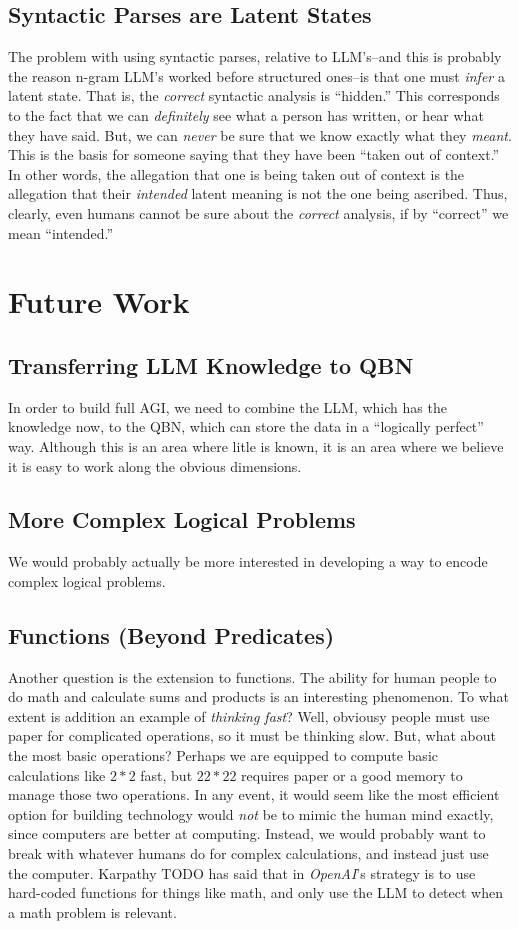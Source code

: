 \documentclass[12pt]{article}
\begin{document}
\subsection{Syntactic Parses are Latent States}
The problem with using syntactic parses, relative to LLM's--and this is probably the reason n-gram LLM's worked before structured ones--is that one must {\em infer} a latent state.
That is, the {\em correct} syntactic analysis is ``hidden.''
This corresponds to the fact that we can {\em definitely} see what a person has written, or hear what they have said.
But, we can {\em never} be sure that we know exactly what they {\em meant}.
This is the basis for someone saying that they have been ``taken out of context.''
In other words, the allegation that one is being taken out of context is the allegation that their {\em intended} latent meaning is not the one being ascribed.
Thus, clearly, even humans cannot be sure about the {\em correct} analysis, if by ``correct'' we mean ``intended.''


\section{Future Work}
\subsection{Transferring LLM Knowledge to QBN}
In order to build full AGI, we need to combine the LLM, which has the knowledge now, to the QBN, which can store the data in a ``logically perfect'' way.
Although this is an area where litle is known, it is an area where we believe it is easy to work along the obvious dimensions.

\subsection{More Complex Logical Problems}
We would probably actually be more interested in developing a way to encode complex logical problems.

\subsection{Functions (Beyond Predicates)}
Another question is the extension to functions.
The ability for human people to do math and calculate sums and products is an interesting phenomenon.
To what extent is addition an example of {\em thinking fast}?
Well, obviousy people must use paper for complicated operations, so it must be thinking slow.
But, what about the most basic operations?
Perhaps we are equipped to compute basic calculations like $2 * 2$ fast, but $22 * 22$ requires paper or a good memory to manage those two operations.
In any event, it would seem like the most efficient option for building technology would {\em not} be to mimic the human mind exactly, since computers are better at computing.
Instead, we would probably want to break with whatever humans do for complex calculations, and instead just use the computer.
Karpathy TODO has said that in {\em OpenAI}'s strategy is to use hard-coded functions for things like math, and only use the LLM to detect when a math problem is relevant.
\end{document}
